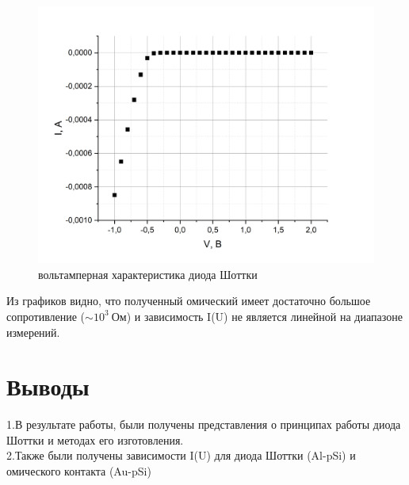 \documentclass[a4paper,12pt]{article}
\begin{document}
\begin{figure}[h!]
	\begin{center}	
	\includegraphics[scale = 0.4]{graph2}
\caption{вольтамперная характеристика диода Шоттки}
	\end{center}
\end{figure}

Из графиков видно, что полученный омический имеет достаточно большое сопротивление ($\sim 10^3 \ Ом$) и зависимость I(U) не является линейной на диапазоне измерений.


\section{Выводы}

1.В результате работы, были получены представления о принципах работы диода Шоттки и методах его изготовления. \\
2.Также были получены зависимости I(U) для диода Шоттки (Al-pSi) и омического контакта (Au-pSi)	
\end{document}
